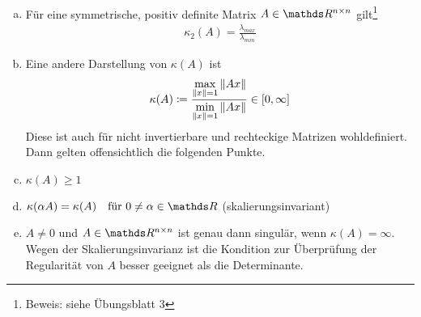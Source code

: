 \begin{Beme}
  \label{3.2.13}~
  \begin{enumerate}[a)]
  \item Für eine symmetrische, positiv definite Matrix
    $A\in \Renn$ gilt\footnote{Beweis: siehe Übungsblatt 3}
    \begin{gather}
      \kappa_2(A) = \frac{\lambda_{max}}{\lambda_{min}} \label{III.2.13}
    \end{gather}
  \item Eine andere Darstellung von $\kappa(A)$ ist
    \begin{gather}
      \kappa(A) \coloneqq 
      \frac{\underset{\nn[x]=1}{\max}\nn[Ax]}
      {\underset{\nn[x]=1}{\min}\nn[Ax]} 
      \in  \left[ 0, \infty \right]
      \label{III.2.14}
    \end{gather}
    Diese ist auch für nicht invertierbare und rechteckige Matrizen wohldefiniert.
    Dann gelten offensichtlich die folgenden Punkte.
  \item $\kappa(A) \geq 1$
  \item $\kappa(\alpha A)=\kappa(A) 
    \quad \text{für } 0\neq\alpha\in\R$ (skalierungsinvariant)
  \item $A\neq 0$ und $A\in\Renn $ ist genau dann singulär, 
    wenn $\kappa(A)=\infty$.
    Wegen der Skalierungsinvarianz ist die Kondition 
    zur Überprüfung der Regularität von $A$ 
    besser geeignet als die Determinante.
  \end{enumerate}
\end{Beme}

